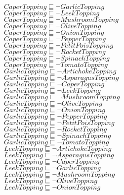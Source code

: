 \documentclass[a4paper,10pt]{article}
\begin{document}
 $CaperTopping \sqsubseteq  \lnot GarlicTopping$\\ 
 $CaperTopping \sqsubseteq  \lnot LeekTopping$\\ 
 $CaperTopping \sqsubseteq  \lnot MushroomTopping$\\ 
 $CaperTopping \sqsubseteq  \lnot OliveTopping$\\ 
 $CaperTopping \sqsubseteq  \lnot OnionTopping$\\ 
 $CaperTopping \sqsubseteq  \lnot PepperTopping$\\ 
 $CaperTopping \sqsubseteq  \lnot PetitPoisTopping$\\ 
 $CaperTopping \sqsubseteq  \lnot RocketTopping$\\ 
 $CaperTopping \sqsubseteq  \lnot SpinachTopping$\\ 
 $CaperTopping \sqsubseteq  \lnot TomatoTopping$\\ 
 $GarlicTopping \sqsubseteq  \lnot ArtichokeTopping$\\ 
 $GarlicTopping \sqsubseteq  \lnot AsparagusTopping$\\ 
 $GarlicTopping \sqsubseteq  \lnot CaperTopping$\\ 
 $GarlicTopping \sqsubseteq  \lnot LeekTopping$\\ 
 $GarlicTopping \sqsubseteq  \lnot MushroomTopping$\\ 
 $GarlicTopping \sqsubseteq  \lnot OliveTopping$\\ 
 $GarlicTopping \sqsubseteq  \lnot OnionTopping$\\ 
 $GarlicTopping \sqsubseteq  \lnot PepperTopping$\\ 
 $GarlicTopping \sqsubseteq  \lnot PetitPoisTopping$\\ 
 $GarlicTopping \sqsubseteq  \lnot RocketTopping$\\ 
 $GarlicTopping \sqsubseteq  \lnot SpinachTopping$\\ 
 $GarlicTopping \sqsubseteq  \lnot TomatoTopping$\\ 
 $LeekTopping \sqsubseteq  \lnot ArtichokeTopping$\\ 
 $LeekTopping \sqsubseteq  \lnot AsparagusTopping$\\ 
 $LeekTopping \sqsubseteq  \lnot CaperTopping$\\ 
 $LeekTopping \sqsubseteq  \lnot GarlicTopping$\\ 
 $LeekTopping \sqsubseteq  \lnot MushroomTopping$\\ 
 $LeekTopping \sqsubseteq  \lnot OliveTopping$\\ 
 $LeekTopping \sqsubseteq  \lnot OnionTopping$\\ 
\end{document}
